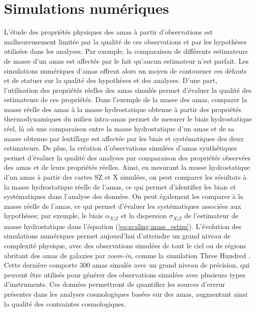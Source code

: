 \section*{Simulations numériques}

L'étude des propriétés physiques des amas à partir d'observations est malheureusement limitée par la qualité de ces observations et par les hypothèses utilisées dans les analyses.
Par exemple, la comparaison de différents estimateurs de masse d'un amas est affectée par le fait qu'aucun estimateur n'est parfait.
Les simulations numériques d'amas offrent alors un moyen de contourner ces défauts et de statuer sur la qualité des hypothèses et des analyses.
D'une part, l'utilisation des propriétés réelles des amas simulés permet d'évaluer la qualité des estimateurs de ces propriétés.
Dans l'exemple de la masse des amas, comparer la masse réelle des amas à la masse hydrostatique obtenue à partir des propriétés thermodynamiques du milieu intra-amas permet de mesurer le biais hydrostatique réel, là où une comparaison entre la masse hydrostatique d'un amas et de sa masse obtenue par lentillage est affectée par les biais et systématiques des deux estimateurs.
De plus, la création d'observations simulées d'amas synthétiques permet d'évaluer la qualité des analyses par comparaison des propriétés observées des amas et de leurs propriétés réelles.
Ainsi, en mesurant la masse hydrostatique d'un amas à partir des cartes SZ et X simulées, on peut comparer les résultats à la masse hydrostatique réelle de l'amas, ce qui permet d'identifier les biais et systématiques dans l'analyse des données.
On peut également les comparer à la masse réelle de l'amas, ce qui permet d'évaluer les systématiques associées aux hypothèses; par exemple, le biais $\alpha_{X|Z}$ et la dispersion $\sigma_{X|Z}$ de l'estimateur de masse hydrostatique dans l'équation (\ref{eq:scaling:mass_estim}).
L'évolution des simulations numériques permet aujourd'hui d'atteindre un grand niveau de complexité physique, avec des observations simulées de tout le ciel \cite{lsst_dark_energy_science_collaboration_lsst_desc_lsst_2021,heitmann_last_2021} ou de régions abritant des amas de galaxies par \textit{zoom-in}, comme la simulation Three Hundred \cite{cui_three_2018}.
Cette dernière comporte 300 amas simulés avec un grand niveau de précision, qui peuvent être utilisés pour générer des observations simulées avec plusieurs types d'instruments.
Ces données permettront de quantifier les sources d'erreur présentes dans les analyses cosmologiques basées sur des amas, augmentant ainsi la qualité des contraintes cosmologiques.

